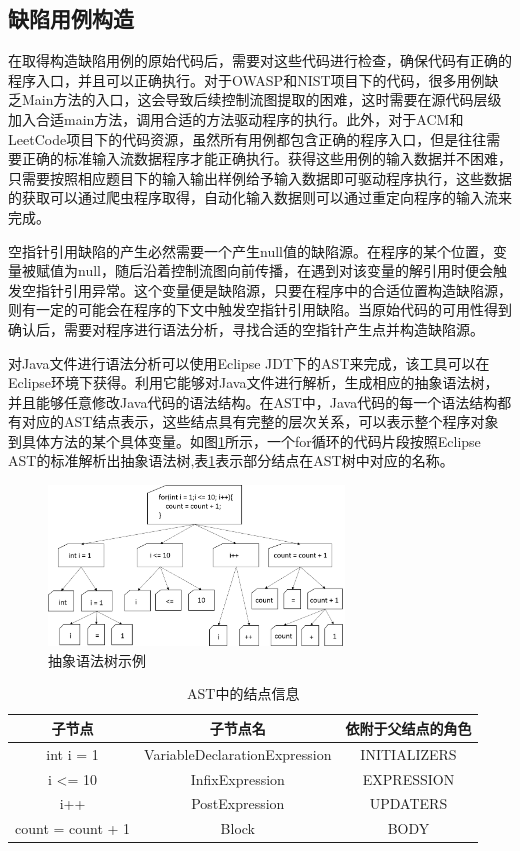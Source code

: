 \subsection{缺陷用例构造}
在取得构造缺陷用例的原始代码后，需要对这些代码进行检查，确保代码有正确的程序入口，并且可以正确执行。对于OWASP和NIST项目下的代码，很多用例缺乏Main方法的入口，这会导致后续控制流图提取的困难，这时需要在源代码层级加入合适main方法，调用合适的方法驱动程序的执行。此外，对于ACM和LeetCode项目下的代码资源，虽然所有用例都包含正确的程序入口，但是往往需要正确的标准输入流数据程序才能正确执行。获得这些用例的输入数据并不困难，只需要按照相应题目下的输入输出样例给予输入数据即可驱动程序执行，这些数据的获取可以通过爬虫程序取得，自动化输入数据则可以通过重定向程序的输入流来完成。

空指针引用缺陷的产生必然需要一个产生null值的缺陷源。在程序的某个位置，变量被赋值为null，随后沿着控制流图向前传播，在遇到对该变量的解引用时便会触发空指针引用异常。这个变量便是缺陷源，只要在程序中的合适位置构造缺陷源，则有一定的可能会在程序的下文中触发空指针引用缺陷。当原始代码的可用性得到确认后，需要对程序进行语法分析，寻找合适的空指针产生点并构造缺陷源。

对Java文件进行语法分析可以使用Eclipse JDT下的AST来完成，该工具可以在Eclipse环境下获得。利用它能够对Java文件进行解析，生成相应的抽象语法树，并且能够任意修改Java代码的语法结构。在AST中，Java代码的每一个语法结构都有对应的AST结点表示，这些结点具有完整的层次关系，可以表示整个程序对象到具体方法的某个具体变量。如图\ref{fig:figure4-2}所示，一个for循环的代码片段按照Eclipse AST的标准解析出抽象语法树,表\ref{tab:table4-1}表示部分结点在AST树中对应的名称。

\begin{figure}
	\centering
	\includegraphics[width=0.70\textwidth]{figures/ast4-2}
	\caption{抽象语法树示例}\label{fig:figure4-2}
\end{figure}

\begin{table}
	\centering
	\caption{AST中的结点信息} \label{tab:table4-1}
	\begin{tabular*}{0.9\textwidth}{@{\extracolsep{\fill}}ccc}
		\toprule
		子节点	&子节点名	&依附于父结点的角色 \\
		\midrule
		int i = 1	&VariableDeclarationExpression	&INITIALIZERS \\
		i <= 10	&InfixExpression	&EXPRESSION \\
		i++	&PostExpression	&UPDATERS \\
		{ count = count + 1 }	&Block	&BODY \\
		\bottomrule
	\end{tabular*}
\end{table}


